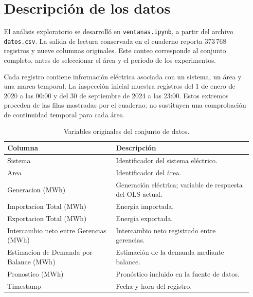 \section{Descripción de los datos}
\label{sec:descripcion-datos}

El análisis exploratorio se desarrolló en \texttt{ventanas.ipynb}, a partir del archivo \texttt{datos.csv}. La salida de lectura conservada en el cuaderno reporta 373\,768 registros y nueve columnas originales. Este conteo corresponde al conjunto completo, antes de seleccionar el área y el periodo de los experimentos.

Cada registro contiene información eléctrica asociada con un sistema, un área y una marca temporal. La inspección inicial muestra registros del 1 de enero de 2020 a las 00:00 y del 30 de septiembre de 2024 a las 23:00. Estos extremos proceden de las filas mostradas por el cuaderno; no sustituyen una comprobación de continuidad temporal para cada área.

\begin{table}[htbp]
\centering
\caption{Variables originales del conjunto de datos.}
\label{tab:variables-originales}
\begin{tabular}{p{}p{}}
\toprule
Columna & Descripción \\
\midrule
Sistema & Identificador del sistema eléctrico. \\
Area & Identificador del área. \\
Generacion (MWh) & Generación eléctrica; variable de respuesta del OLS actual. \\
Importacion Total (MWh) & Energía importada. \\
Exportacion Total (MWh) & Energía exportada. \\
Intercambio neto entre Gerencias (MWh) & Intercambio neto registrado entre gerencias. \\
Estimacion de Demanda por Balance (MWh) & Estimación de la demanda mediante balance. \\
Pronostico (MWh) & Pronóstico incluido en la fuente de datos. \\
Timestamp & Fecha y hora del registro. \\
\bottomrule
\end{tabular}
\end{table}

